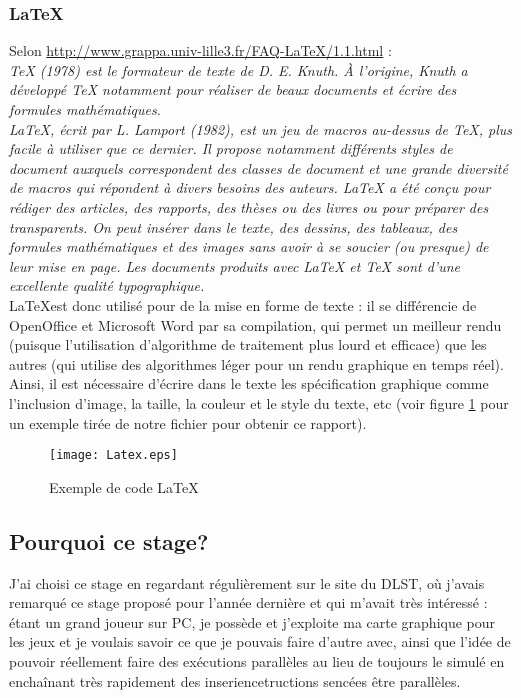 \documentclass[a4paper,12pt]{article}
\begin{document}
{{	\subsubsection{\LaTeX}
	\indent Selon \url{http://www.grappa.univ-lille3.fr/FAQ-LaTeX/1.1.html} :\\ \textit{TeX (1978) est le formateur de texte de D. E. Knuth. \`A l'origine, Knuth a développé TeX notamment pour réaliser de beaux documents et \'e{}crire des formules mathématiques.\\
    LaTeX, écrit par L. Lamport (1982), est un jeu de macros au-dessus de TeX, plus facile à utiliser que ce dernier. Il
propose notamment différents styles de document auxquels
correspondent des classes de document et une grande diversité
de macros qui répondent à divers besoins des auteurs. LaTeX a
été conçu pour rédiger des articles, des rapports, des thèses ou
des livres ou pour préparer des transparents. On peut insérer
dans le texte, des dessins, des tableaux, des formules
mathématiques et des images sans avoir à se soucier (ou presque)
de leur mise en page. Les documents produits avec LaTeX et TeX
sont d'une excellente qualité typographique.} \\
\indent \LaTeX est donc utilis\'e pour de la mise en forme de texte : il se diff\'erencie de OpenOffice et Microsoft Word par sa compilation, qui permet un meilleur rendu (puisque l'utilisation d'algorithme de traitement plus lourd et efficace) que les autres (qui utilise des algorithmes l\'e{}ger pour un rendu graphique en temps r\'e{}el). Ainsi, il est n\'e{}cessaire d'\'e{}crire dans le texte les sp\'e{}cification graphique comme l'inclusion d'image, la taille, la couleur et le style du texte, etc (voir figure \ref{fig:Latex} pour un exemple tir\'e{}e de notre fichier pour obtenir ce rapport).~
	\begin{figure}[!ht]
	    \centering
	    \caption{Exemple de code \LaTeX}
	    \label{fig:Latex}
	    \texttt{[image: Latex.eps]}
	\end{figure}
	\subsection{Pourquoi ce stage?}
	\indent J'ai choisi ce stage en regardant r\'e{}gulièrement sur le site du DLST, o\`u j'avais remarqu\'e ce stage propos\'e pour l'ann\'e{}e derni\`ere et qui m'avait tr\`es int\'e{}ress\'e : \'e{}tant un grand joueur sur PC, je poss\`ede et j'exploite ma carte graphique pour les jeux et je voulais savoir ce que je pouvais faire d'autre avec, ainsi que l'id\'e{}e de pouvoir r\'e{}ellement faire des ex\'e{}cutions parall\`eles au lieu de toujours le simul\'e en encha\^inant tr\`es rapidement des inse{}riencetructions senc\'e{}es \^etre parall\`eles.
	\newpage
}}
\end{document}
